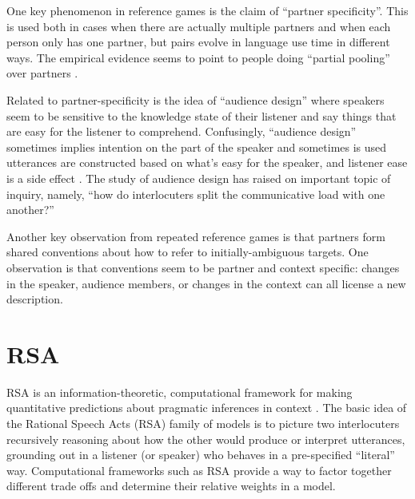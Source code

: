 \documentclass[]{article}
\begin{document}
One key phenomenon in reference games is the claim of ``partner specificity''. This is used both in cases when there are actually multiple partners and when each person only has one partner, but pairs evolve in language use time in different ways. The empirical evidence seems to point to people doing ``partial pooling'' over partners \cite{hawkins2021, yoon2014}. 

Related to partner-specificity is the idea of ``audience design'' where speakers seem to be sensitive to the knowledge state of their listener and say things that are easy for the listener to comprehend. Confusingly, ``audience design'' sometimes implies intention on the part of the speaker and sometimes is used utterances are constructed based on what's easy for the speaker, and listener ease is a side effect \cite{horton1996, rogers2013}. The study of audience design has raised on important topic of inquiry, namely, ``how do interlocuters split the communicative load with one another?''

Another key observation from repeated reference games is that partners form shared conventions about how to refer to initially-ambiguous targets. One observation is that conventions seem to be partner and context specific: changes in the speaker, audience members, or changes in the context can all license a new description. %


\section{RSA}

RSA is an information-theoretic, computational framework for making quantitative predictions about pragmatic inferences in context \cite{goodman2016, frank2012a}. The basic idea of the Rational Speech Acts (RSA) family of models is to picture two interlocuters recursively reasoning about how the other would produce or interpret utterances, grounding out in a listener (or speaker) who behaves in a pre-specified ``literal'' way. Computational frameworks such as RSA provide a way to factor together different trade offs and determine their relative weights in a model. 
\end{document}
